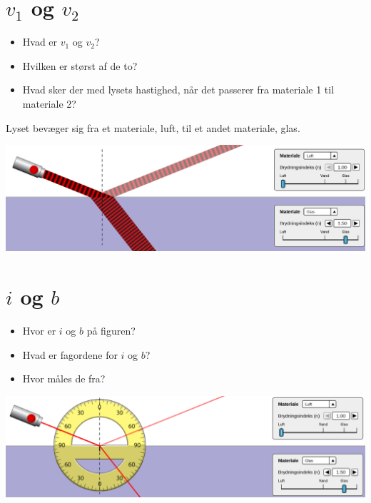 \documentclass[a4paper, 12pt]{article}
\begin{document}
\vfill
\newpage


\section*{\(v_1\) og \(v_2\)}
\label{sec:org008c659}

\begin{minipage}{0.3\linewidth}
\begin{itemize}
\item Hvad er \(v_1\) og \(v_2\)?
\item Hvilken er størst af de to?
\item Hvad sker der med lysets hastighed, når det passerer fra materiale 1 til materiale 2?
\end{itemize}
\end{minipage}
\vline
\begin{minipage}{0.68\linewidth}
Lyset bevæger sig fra et materiale, luft, til et andet materiale, glas.
\begin{center}
\includegraphics[width=.9\linewidth]{./img/laser_luft_glas.png}
\end{center}  
\end{minipage}


\vfill

\section*{\(i\) og \(b\)}
\label{sec:org772f27c}

\begin{minipage}{0.3\linewidth}
\begin{itemize}
\item Hvor er \(i\) og \(b\) på figuren?
\item Hvad er fagordene for \(i\) og \(b\)?
\item Hvor måles de fra?
\end{itemize}
\end{minipage}
\vline
\begin{minipage}{0.68\linewidth}
\begin{center}
\includegraphics[width=.9\linewidth]{./img/laser_luft_glas_vinkel.png}
\end{center}
\end{minipage}
\end{document}
